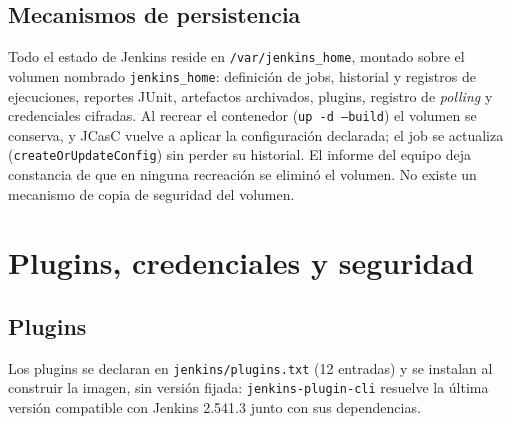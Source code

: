 \documentclass[11pt,a4paper]{article}
\begin{document}
\subsection{Mecanismos de persistencia}

Todo el estado de Jenkins reside en \texttt{/var/jenkins\_home}, montado sobre el volumen nombrado
\texttt{jenkins\_home}: definición de jobs, historial y registros de ejecuciones, reportes JUnit,
artefactos archivados, plugins, registro de \emph{polling} y credenciales cifradas. Al recrear el
contenedor (\texttt{up -d --build}) el volumen se conserva, y JCasC vuelve a aplicar la configuración
declarada; el job se actualiza (\texttt{createOrUpdateConfig}) sin perder su historial. El informe del
equipo deja constancia de que en ninguna recreación se eliminó el volumen. No existe un mecanismo de
copia de seguridad del volumen.

\section{Plugins, credenciales y seguridad}
\label{sec:seguridad}

\subsection{Plugins}

Los plugins se declaran en \texttt{jenkins/plugins.txt} (12 entradas) y se instalan al construir la
imagen, sin versión fijada: \texttt{jenkins-plugin-cli} resuelve la última versión compatible con
Jenkins 2.541.3 junto con sus dependencias.
\end{document}
